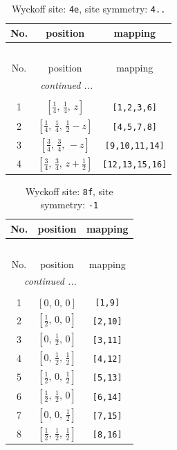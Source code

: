 \documentclass[fleqn,8pt]{jsarticle}
\begin{document}
\renewcommand{\arraystretch}{1.2}
\begin{longtable}{ccc}
\caption{Wyckoff site: {\tt 4e}, site symmetry: {\tt 4..}}
 \\
 \hline \hline
No. & position & mapping \\ \hline \endfirsthead

\multicolumn{2}{l}{\tablename\ \thetable{}} \\
 \hline \hline
No. & position & mapping \\ \hline \endhead

 \hline \hline
\multicolumn{2}{r}{\footnotesize\it continued ...} \\ \endfoot

 \hline \hline
\multicolumn{2}{r}{} \\ \endlastfoot

1 & $\left[ \frac{1}{4},\, \frac{1}{4},\, z \right]$ & {\tt [1,2,3,6]} \\ \hline
2 & $\left[ \frac{1}{4},\, \frac{1}{4},\, \frac{1}{2} - z \right]$ & {\tt [4,5,7,8]} \\ \hline
3 & $\left[ \frac{3}{4},\, \frac{3}{4},\, - z \right]$ & {\tt [9,10,11,14]} \\ \hline
4 & $\left[ \frac{3}{4},\, \frac{3}{4},\, z + \frac{1}{2} \right]$ & {\tt [12,13,15,16]} \\
\end{longtable}
\renewcommand{\arraystretch}{1.2}
\begin{longtable}{ccc}
\caption{Wyckoff site: {\tt 8f}, site symmetry: {\tt -1}}
 \\
 \hline \hline
No. & position & mapping \\ \hline \endfirsthead

\multicolumn{2}{l}{\tablename\ \thetable{}} \\
 \hline \hline
No. & position & mapping \\ \hline \endhead

 \hline \hline
\multicolumn{2}{r}{\footnotesize\it continued ...} \\ \endfoot

 \hline \hline
\multicolumn{2}{r}{} \\ \endlastfoot

1 & $\left[ 0,\, 0,\, 0 \right]$ & {\tt [1,9]} \\ \hline
2 & $\left[ \frac{1}{2},\, 0,\, 0 \right]$ & {\tt [2,10]} \\ \hline
3 & $\left[ 0,\, \frac{1}{2},\, 0 \right]$ & {\tt [3,11]} \\ \hline
4 & $\left[ 0,\, \frac{1}{2},\, \frac{1}{2} \right]$ & {\tt [4,12]} \\ \hline
5 & $\left[ \frac{1}{2},\, 0,\, \frac{1}{2} \right]$ & {\tt [5,13]} \\ \hline
6 & $\left[ \frac{1}{2},\, \frac{1}{2},\, 0 \right]$ & {\tt [6,14]} \\ \hline
7 & $\left[ 0,\, 0,\, \frac{1}{2} \right]$ & {\tt [7,15]} \\ \hline
8 & $\left[ \frac{1}{2},\, \frac{1}{2},\, \frac{1}{2} \right]$ & {\tt [8,16]} \\
\end{longtable}
\end{document}
